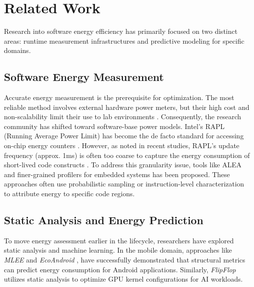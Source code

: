 \section{Related Work}
\label{sec:related}
Research into software energy efficiency has primarily focused on two distinct areas: runtime measurement infrastructures and predictive modeling for specific domains. 

\subsection{Software Energy Measurement}

Accurate energy measurement is the prerequisite for optimization. The most reliable method involves external hardware power meters, but their high cost and non-scalability limit their use to lab environments \cite{Hindle2014GreenMining}. Consequently, the research community has shifted toward software-base power models. Intel's RAPL (Running Average Power Limit) has become the de facto standard for accessing on-chip energy counters \cite{Khan2018RAPLinAction}. However, as noted in recent studies, RAPL's update frequency (approx. 1ms) is often too coarse to capture the energy consumption of short-lived code constructs \cite{10.1145/2425248.2425252}. 
To address this granularity issue, tools like ALEA \cite{7429297} and finer-grained profilers for embedded systems has been proposed. These approaches often use probabilistic sampling or instruction-level characterization to attribute energy to specific code regions. 


\subsection{Static Analysis and Energy Prediction}

To move energy assessment earlier in the lifecycle, researchers have explored static analysis and machine learning. 
In the mobile domain, approaches like \textit{MLEE}\cite{ALVI2021100594} and \textit{EcoAndroid} \cite{Ribeiro2021EcoAndroid}, have successfully demonstrated that structural metrics can predict energy consumption for Android applications. Similarly, \textit{FlipFlop} \cite{Sharma2024FlipFlop} utilizes static analysis to optimize GPU kernel configurations for AI workloads. 

